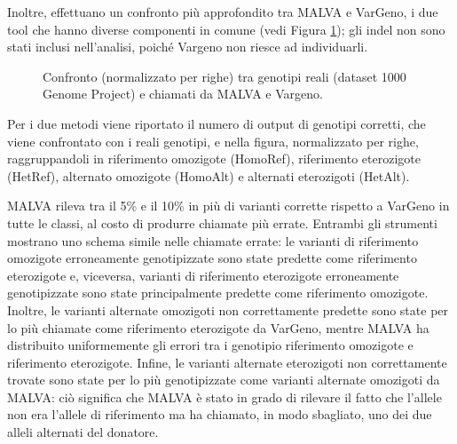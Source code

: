 \documentclass[../main.tex]{subfiles}
\begin{document}
\noindent
Inoltre, \cite{bernardini2019malva} effettuano un confronto più approfondito tra MALVA e VarGeno, i due tool che hanno diverse componenti in comune (vedi Figura \ref{fig:confronto3}); gli indel non sono stati inclusi nell'analisi, poiché Vargeno non riesce ad individuarli.

\begin{figure}[h!]
	\centering
  	\captionsetup{justification=centering}
  	\caption{Confronto (normalizzato per righe) tra genotipi reali (dataset 1000 Genome Project) e chiamati da MALVA e Vargeno.}
  	\label{fig:confronto3}
\end{figure}

\noindent
Per i due metodi viene riportato il numero di output di genotipi corretti, che viene confrontato con i reali genotipi, e nella figura, normalizzato per righe, raggruppandoli in riferimento omozigote (HomoRef), riferimento eterozigote (HetRef), alternato omozigote (HomoAlt) e alternati eterozigoti (HetAlt).

MALVA rileva tra il 5\% e il 10\% in più di  varianti corrette rispetto a VarGeno in tutte le classi, al costo di produrre chiamate più errate. Entrambi gli strumenti mostrano uno schema simile nelle chiamate errate: le varianti di riferimento omozigote erroneamente genotipizzate sono state predette come riferimento eterozigote e, viceversa, varianti di riferimento eterozigote erroneamente genotipizzate sono state principalmente predette come riferimento omozigote. Inoltre, le varianti alternate omozigoti non correttamente predette sono state per lo più chiamate come riferimento eterozigote da VarGeno, mentre MALVA ha distribuito uniformemente gli errori tra i genotipio riferimento omozigote e riferimento eterozigote. Infine, le varianti alternate eterozigoti non correttamente trovate sono state per lo più genotipizzate come varianti alternate omozigoti da MALVA: ciò significa che MALVA  è stato in grado di rilevare il fatto che l'allele non era l'allele di riferimento ma ha chiamato, in modo sbagliato, uno dei due alleli alternati del donatore. 
\end{document}

